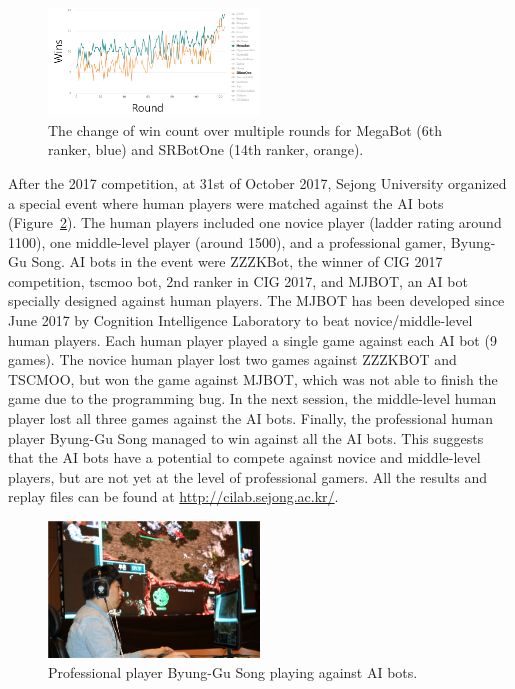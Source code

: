 \begin{figure}[h]
  \centering
  \includegraphics[width=0.5\textwidth]{fig/cig-megabot-srbotone.png}
  \caption{The change of win count over multiple rounds for MegaBot (6th ranker, blue) and SRBotOne (14th ranker, orange).}
  \label{figureCIGMEGASRBOT}
\end{figure} 


After the 2017 competition, at 31st of October 2017, Sejong University organized a special event where human players were matched against the AI bots (Figure~\ref{figureSong}). The human players included one novice player (ladder rating around 1100), one middle-level player (around 1500), and a professional gamer, Byung-Gu Song. AI bots in the event were ZZZKBot, the winner of CIG 2017 competition, tscmoo bot, 2nd ranker in CIG 2017, and MJBOT, an AI bot specially designed against human players. The MJBOT has been developed since June 2017 by Cognition Intelligence Laboratory  to beat novice/middle-level human players. 
Each human player played a single game against each AI bot (9 games). 
The novice human player lost two games against ZZZKBOT and TSCMOO, but won the game against MJBOT, which was not able to finish the game due to the programming bug. In the next session, the middle-level human player lost all three games against the AI bots. Finally, the professional human player Byung-Gu Song managed to win against all the AI bots. This suggests that the AI bots have a potential to compete against novice and middle-level players, but are not yet at the level of professional gamers. All the results and replay files can be found at {\url{http://cilab.sejong.ac.kr/}}. 

\begin{figure}[h]
  \centering
  \includegraphics[width=0.5\textwidth]{fig/song_human_ai.png}
  \caption{Professional player Byung-Gu Song playing against AI bots.}
  \label{figureSong}
\end{figure} 
